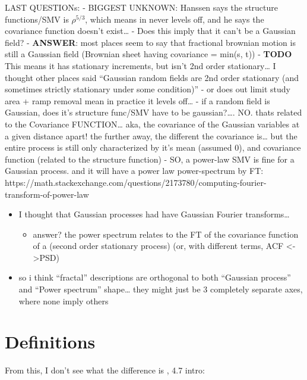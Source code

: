 \documentclass{utexasthesis}
\begin{document}
LAST QUESTIONs: - BIGGEST UNKNOWN: Hanssen says the structure
functions/SMV is \(\rho^{5/3}\), which means in never levels off, and he
says the covariance function doesn't exist\ldots{} - Does this imply
that it can't be a Gaussian field? - \textbf{ANSWER}: most places seem
to say that fractional brownian motion is still a Gaussian field
(Brownian sheet having covariance = min(s, t)) - \textbf{TODO} This
means it has stationary increments, but isn't 2nd order
stationary\ldots{} I thought other places said ``Gaussian random fields
are 2nd order stationary (and sometimes strictly stationary under some
condition)'' - or does out limit study area + ramp removal mean in
practice it levels off\ldots{} - if a random field is Gaussian, does
it's structure func/SMV have to be gaussian?\ldots{}. NO. thats related
to the Covariance FUNCTION\ldots{} aka, the covariance of the Gaussian
variables at a given distance apart! the further away, the different the
covariance is\ldots{} but the entire process is still only characterized
by it's mean (assumed 0), and covariance function (related to the
structure function) - SO, a power-law SMV is fine for a Gaussian
process. and it will have a power law power-spectrum by FT:
https://math.stackexchange.com/questions/2173780/computing-fourier-transform-of-power-law

\begin{itemize}

\item
  I thought that Gaussian processes had have Gaussian Fourier
  transforms\ldots{}

  \begin{itemize}
  
  \item
    answer? the power spectrum relates to the FT of the covariance
    function of a (second order stationary process) (or, with different
    terms, ACF <->PSD)
  \end{itemize}
\item
  so i think ``fractal'' descriptions are orthogonal to both ``Gaussian
  process'' and ``Power spectrum'' shape\ldots{} they might just be 3
  completely separate axes, where none imply others
\end{itemize}

\hypertarget{definitions}{%
\section{Definitions}\label{definitions}}

From \cite{Hanssen2001} this, I don't see \citet{Hanssen2001} what the difference is \citep{Hanssen2001} , 4.7 intro: 
\end{document}
